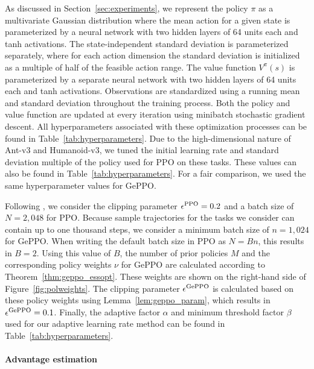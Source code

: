 \documentclass{article}
\begin{document}
As discussed in Section~\ref{sec:experiments}, we represent the policy $\pi$ as a multivariate Gaussian distribution where the mean action for a given state is parameterized by a neural network with two hidden layers of 64 units each and tanh activations. The state-independent standard deviation is parameterized separately, where for each action dimension the standard deviation is initialized as a multiple of half of the feasible action range. The value function $V^{\pi}(s)$ is parameterized by a separate neural network with two hidden layers of 64 units each and tanh activations. Observations are standardized using a running mean and standard deviation throughout the training process. Both the policy and value function are updated at every iteration using minibatch stochastic gradient descent. All hyperparameters associated with these optimization processes can be found in Table~\ref{tab:hyperparameters}. Due to the high-dimensional nature of Ant-v3 and Humanoid-v3, we tuned the initial learning rate and standard deviation multiple of the policy used for PPO on these tasks. These values can also be found in Table~\ref{tab:hyperparameters}. For a fair comparison, we used the same hyperparameter values for GePPO.

Following \citet{henderson_2018}, we consider the clipping parameter $\epsilon^{\textnormal{PPO}} = 0.2$ and a batch size of $N=2{,}048$ for PPO. Because sample trajectories for the tasks we consider can contain up to one thousand steps, we consider a minimum batch size of $n=1{,}024$ for GePPO. When writing the default batch size in PPO as $N=Bn$, this results in $B=2$. Using this value of $B$, the number of prior policies $M$ and the corresponding policy weights $\nu$ for GePPO are calculated according to Theorem~\ref{thm:geppo_essopt}. These weights are shown on the right-hand side of Figure~\ref{fig:polweights}. The clipping parameter $\epsilon^{\textnormal{GePPO}}$ is calculated based on these policy weights using Lemma~\ref{lem:geppo_param}, which results in $\epsilon^{\textnormal{GePPO}}=0.1$. Finally, the adaptive factor $\alpha$ and minimum threshold factor $\beta$ used for our adaptive learning rate method can be found in Table~\ref{tab:hyperparameters}. 

\paragraph{Advantage estimation}
\end{document}
